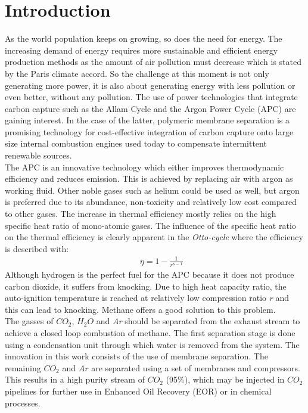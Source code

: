 \section{Introduction}
As the world population keeps on growing, so does the need for energy. The increasing demand of energy requires more sustainable and efficient energy production methods as the amount of air pollution must decrease which is stated by the Paris climate accord. So the challenge at this moment is not only generating more power, it is also about generating energy with less pollution or even better, without any pollution. The use of power technologies that integrate carbon capture such as the Allam Cycle and the Argon Power Cycle (APC) are gaining interest. In the case of the latter, polymeric membrane separation is a promising technology for cost-effective integration of carbon capture onto large size internal combustion engines used today to compensate intermittent renewable sources. \\
The APC is an innovative technology which either improves thermodynamic efficiency and reduces emission. This is achieved by replacing air with argon as working fluid. Other noble gases such as helium could be used as well, but argon is preferred due to its abundance, non-toxicity and relatively low cost compared to other gases. The increase in thermal efficiency mostly relies on the high specific heat ratio of mono-atomic gases. The influence of the specific heat ratio on the thermal efficiency is clearly apparent in the \textit{Otto-cycle} where the efficiency is described with:
\vspace{-0.3cm}
\begin{align}
	&&\eta = 1 - \frac{1}{r^{\kappa - 1}}
\end{align}
Although hydrogen is the perfect fuel for the APC because it does not produce carbon dioxide, it suffers from knocking. Due to high heat capacity ratio, the auto-ignition temperature is reached at relatively low compression ratio \textit{r} and this can lead to knocking. Methane offers a good solution to this problem. \\ 

The gasses of $CO_2$, $H_2O$ and \textit{Ar} should be separated from the exhaust stream to achieve a closed loop combustion of methane. The first separation stage is done using a condensation unit through which water is removed from the system. The innovation in this work consists of the use of membrane separation. The remaining $CO_2$ and $Ar$ are separated using a set of membranes and compressors. This results in a high purity stream of $CO_2$ (95$\%$), which may be injected in $CO_2$ pipelines for further use in Enhanced Oil Recovery (EOR) or in chemical processes.  \cite{Chourou2017}


